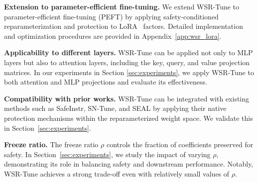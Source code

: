 \documentclass{article}
\newcommand{\wjb}[1]{{\leavevmode\color{orange}[jb: #1]}}
\newcommand{\jsp}[1]{{\leavevmode\color{olive}[js: #1]}}
\begin{document}


\textbf{Extension to parameter-efficient fine-tuning.}
\label{sec:wsr_lora}
We extend WSR-Tune to parameter-efficient fine-tuning (PEFT) by applying safety-conditioned reparameterization and protection to LoRA~\citep{lora} factors. Detailed implementation and optimization procedures are provided in Appendix~\ref{app:wsr_lora}.






\textbf{Applicability to different layers.} WSR-Tune can be applied not only to MLP layers but also to attention layers, including the key, query, and value projection matrices. In our experiments in Section \ref{sec:experiments}, we apply WSR-Tune to both attention and MLP projections and evaluate its effectiveness.

\textbf{Compatibility with prior works.}
WSR-Tune can be integrated with existing methods such as SafeInstr, SN-Tune, and SEAL by applying their native protection mechanisms within the reparameterized weight space. We validate this in Section~\ref{sec:experiments}.


\textbf{Freeze ratio.} The freeze ratio $\rho$ controls the fraction of coefficients preserved for safety. In Section~\ref{sec:experiments}, we study the impact of varying $\rho$, demonstrating its role in balancing safety and downstream performance. Notably, WSR-Tune achieves a strong trade-off even with relatively small values of $\rho$.

\end{document}
